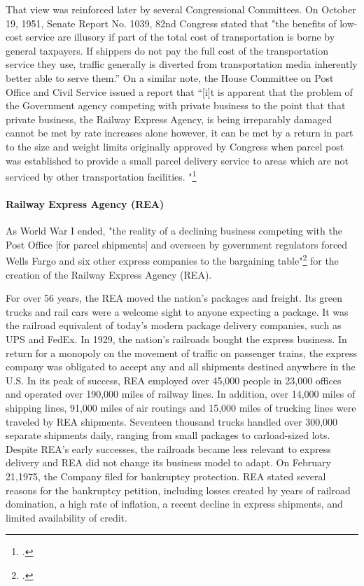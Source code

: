 That view was reinforced later by several Congressional Committees.  On October 19, 1951, Senate Report No. 1039, 82nd Congress stated that "the benefits of low-cost service are illusory if part of the total cost of transportation is borne by general taxpayers. If shippers do not pay the full cost of the transportation service they use, traffic generally is diverted from transportation media inherently better able to serve them.” On a similar note, the House Committee on Post Office and Civil Service issued a report that “[i]t is apparent that the problem of the Government agency competing with private business to the point that that private business, the Railway Express Agency, is being irreparably damaged cannot be met by rate increases alone however, it can be met by a return in part to the size and weight limits originally approved by Congress when parcel post was established to provide a small parcel delivery service to areas which are not serviced by other transportation facilities. "\footcite{Stagcoach}

\paragraph{Railway Express Agency (REA)} As World War I ended, "the reality of a declining business competing with the Post Office [for parcel shipments] and overseen by government regulators forced Wells Fargo and six other express companies to the bargaining table"\footcite{Stagcoach} for the creation of the Railway Express Agency (REA). 

For over 56 years, the REA moved the nation's packages and freight. Its green trucks and rail cars were a welcome sight to anyone expecting a package. It was the railroad equivalent of today's modern package delivery companies, such as UPS and FedEx.   In 1929, the nation's railroads bought the express business. In return for a monopoly on the movement of traffic on passenger trains, the express company was obligated to accept any and all shipments destined anywhere in the U.S.  In its peak of success, REA employed over 45,000 people in 23,000 offices and operated over 190,000 miles of railway lines.  In addition, over 14,000 miles of shipping lines, 91,000 miles of air routings and 15,000 miles of trucking lines were traveled by REA shipments.  Seventeen thousand trucks handled over 300,000 separate shipments daily, ranging from small packages to carload-sized lots.
Despite REA's early successes, the railroads became less relevant to express delivery and REA did not change its business model to adapt. On February 21,1975, the Company filed for bankruptcy protection.  REA stated several reasons for the bankruptcy petition, including losses created by years of railroad domination, a high rate of inflation, a recent decline in express shipments, and limited availability of credit.

